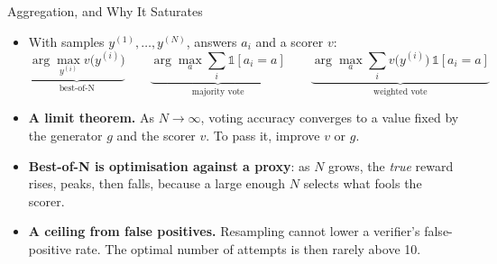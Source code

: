 \begin{frame}{Aggregation, and Why It Saturates}
    \begin{itemize}\itemsep0.05em
        \item With samples $y^{(1)},\dots,y^{(N)}$, answers $a_i$ and a scorer $v$:
        \[
            \underbrace{\arg\max_{y^{(i)}} v\big(y^{(i)}\big)}_{\text{best-of-N}}
            \qquad
            \underbrace{\arg\max_a \sum_{i} \mathbb{1}[a_i=a]}_{\text{majority vote}}
            \qquad
            \underbrace{\arg\max_a \sum_{i} v\big(y^{(i)}\big)\,\mathbb{1}[a_i=a]}_{\text{weighted vote}}
        \]
        \item \textbf{A limit theorem.} As $N\to\infty$, voting accuracy converges to a value fixed by the generator $g$ and the scorer $v$. To pass it, improve $v$ or $g$.
        \item \textbf{Best-of-N is optimisation against a proxy}: as $N$ grows, the \emph{true} reward rises, peaks, then \alert{falls}, because a large enough $N$ selects what fools the scorer.
        \item \textbf{A ceiling from false positives.} Resampling cannot lower a verifier's false-positive rate. The optimal number of attempts is then rarely above 10.
    \end{itemize}
    \vspace{0.1em}
\end{frame}


